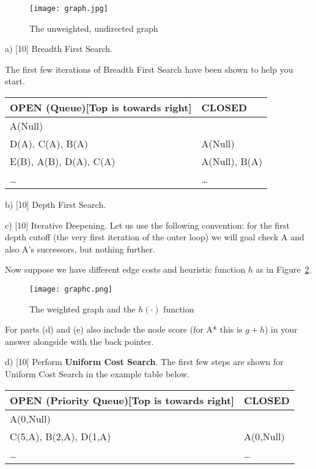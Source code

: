 \documentclass[10pt,a4paper]{article}
\begin{document}
\begin{figure}[hb]
\centering
\texttt{[image: graph.jpg]}
\caption{The unweighted, undirected graph}
\label{fig:unweighted}
\end{figure}

\noindent a) [10] {Breadth First Search}.

The first few iterations of Breadth First Search have been shown to help you start.

\begin{center}
 \begin{tabular}{|l | l|} 
 \hline
 \textbf{OPEN (Queue)[Top is towards right]} & \textbf{CLOSED} \\  
 \hline
 A(Null) & \\
 \hline
 D(A), C(A), B(A) & A(Null)\\ 
 \hline
 E(B), A(B), D(A), C(A) & A(Null), B(A)\\
 \hline
 \dots & \dots \\
 \hline
\end{tabular}
\end{center}


\noindent b) [10] {Depth First Search}.

\noindent c) [10] {Iterative Deepening}.  
Let us use the following convention: for the first depth cutoff (the very first iteration of the outer loop) we will goal check A and also A's successors, but nothing further.


\clearpage
\noindent Now suppose we have different edge costs and heuristic function $h$ as in Figure~\ref{fig:weighted}. 

\begin{figure}[!h]
\centering
\texttt{[image: graphc.png]}
\caption{The weighted graph and the $h(\cdot)$ function}
\label{fig:weighted}
\end{figure}

For parts (d) and (e) also include the node score (for A* this is $g+h$) in your answer alongside with the back pointer. 

\noindent d) [10] Perform \textbf{Uniform Cost Search}.
The first few steps are shown for Uniform Cost Search in the example table below.
\begin{center}
\begin{tabular}{|l|l|}
\hline
\textbf{OPEN (Priority Queue)[Top is towards right]} & \textbf{CLOSED}\\
\hline
A(0,Null) & \\
\hline
C(5,A), B(2,A), D(1,A) & A(0,Null) \\
\hline
 \dots & \dots \\
 \hline
\end{tabular}
\end{center}
\end{document}
